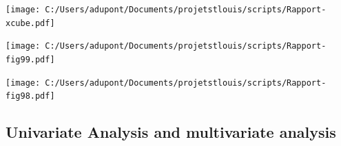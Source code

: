 \documentclass[a4paper,11pt] {article}
\begin{document}
\begin{center} 
 
\texttt{[image: C:/Users/adupont/Documents/projetstlouis/scripts/Rapport-xcube.pdf]}






\pagebreak

\begin{center}
\texttt{[image: C:/Users/adupont/Documents/projetstlouis/scripts/Rapport-fig99.pdf]}

\end{center}
\pagebreak
\begin{center}
\texttt{[image: C:/Users/adupont/Documents/projetstlouis/scripts/Rapport-fig98.pdf]}

\end{center}

\begin{landscape}

\subsection{Univariate Analysis and multivariate analysis }


\end{landscape}
\end{center}
\end{document}
